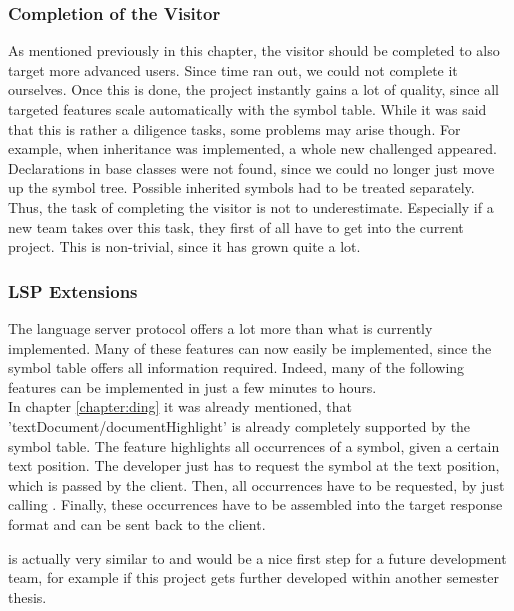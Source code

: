 \subsubsection{Completion of the Visitor}
As mentioned previously in this chapter, the visitor should be completed to also target more advanced users.
Since time ran out, we could not complete it ourselves.
Once this is done, the project instantly gains a lot of quality, since all targeted features scale automatically with the symbol table.
While it was said that this is rather a diligence tasks, some problems may arise though.
For example, when inheritance was implemented, a whole new challenged appeared.
Declarations in base classes were not found, since we could no longer just move up the symbol tree.
Possible inherited symbols had to be treated separately.
Thus, the task of completing the visitor is not to underestimate.
Especially if a new team takes over this task, they first of all have to get into the current project.
This is non-trivial, since it has grown quite a lot.


\subsubsection{LSP Extensions}
The language server protocol \cite{lspspec} offers a lot more than what is currently implemented.
Many of these features can now easily be implemented, since the symbol table offers all information required.
Indeed, many of the following features can be implemented in just a few minutes to hours.\\

In chapter \ref{chapter:ding} it was already mentioned, that 'textDocument/documentHighlight' \cite{lspspec} is already completely supported by the symbol table.
The feature highlights all occurrences of a symbol, given a certain text position.
The developer just has to request the symbol at the text position, which is passed by the client.
Then, all occurrences have to be requested, by just calling .
Finally, these occurrences have to be assembled into the target response format  and can be sent back to the client.

 is actually very similar to  and would be a nice first step for a future development team,
for example if this project gets further developed within another semester thesis.\\

